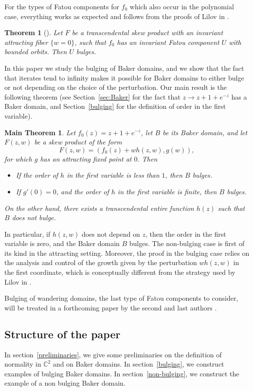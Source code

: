 \documentclass[a4paper, 12pt, twoside]{amsart}
\newtheorem{thm}{Theorem}[section]
\newtheorem*{mainthm}{Main Theorem}
\theoremstyle{definition}
\numberwithin{equation}{section}
\newcommand{\C}{{\mathbb C}}
\newcommand{\ra}{\rightarrow}
\begin{document}
   For the types of Fatou components for $f_{0}$ which also occur in the polynomial case, everything works as expected and follows from the proofs of Lilov in \cite{Lilov}.
  
   \begin{thm}[{\cite[Sect. 3.2.1]{Lilov}}]
  Let $F$ be  a transcendental skew product with an invariant attracting fiber $\{w=0\}$, such that $f_{0}$ has an invariant Fatou component $U$ with bounded orbits.  Then $U$ bulges.
  \end{thm}
  
  In this paper we study the bulging of Baker domains, and we show that the fact that iterates tend to infinity makes it possible for Baker domains to either bulge or not depending on the choice of the perturbation. Our main result is the following theorem (see Section~\ref{sec:Baker} for the fact that $z\ra z+1+e^{-z}$ has a Baker domain, and Section~\ref{bulging} for the definition of order  in the first variable).
  
 \begin{mainthm}
Let $f_{0}(z)=z+1+e^{-z}$, let $B$ be its Baker domain, and let $F(z,w)$ be a skew product of the form 
$$
F(z,w)=(f_{0}(z)+w h (z,w),g(w)),
$$
 for which $g$ has an attracting fixed point at $0$. 
Then \begin{itemize}
\item If  the order  of $h$ in the first variable is less than $1$, then $B$ bulges. 
\item If  $g'(0)=0$, and  the order  of $h$ in the first variable is finite, then $B$ bulges. 
\end{itemize}
On the other hand, there exists a transcendental entire function $h(z)$ such that $B$ does not bulge.
  \end{mainthm}
  In particular, if  $ h(z,w)$ does not depend on $z$, then the order in the first variable is zero, and the  Baker domain $B$ bulges. The non-bulging case is first of its kind in the attracting setting. Moreover, the proof in the bulging case relies on the analysis and control of the growth given by the perturbation $w h(z,w)$ in the first coordinate, which is conceptually different from the strategy used by Lilov in \cite{Lilov}. 
    
Bulging of  wandering domains, the last type of Fatou components to consider,  will be treated in a forthcoming paper by the second and last authors \cite{TJ}. 

\smallskip
\subsection*{Structure of the paper} In section~\ref{preliminaries}, we give some preliminaries on the definition of normality in $\C^2$ and on Baker domains. In section~\ref{bulging}, we construct examples of bulging Baker domains. In section~\ref{non-bulging}, we construct the example of a non bulging Baker domain. 
\end{document}
